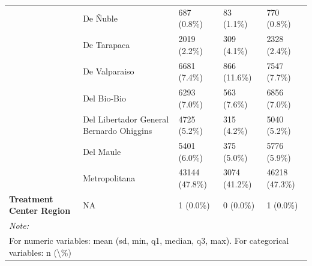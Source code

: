\documentclass[
  spanish,
  10pt,
]{article}
\begin{document}
\begin{table}[H]
{\begin{tabular}[t]{>{}lllll}
\cmidrule{2-5}
 & De Ñuble & 687 (0.8\%) & 83 (1.1\%) & 770 (0.8\%)\\
\cmidrule{2-5}
 & De Tarapaca & 2019 (2.2\%) & 309 (4.1\%) & 2328 (2.4\%)\\
\cmidrule{2-5}
 & De Valparaiso & 6681 (7.4\%) & 866 (11.6\%) & 7547 (7.7\%)\\
\cmidrule{2-5}
 & Del Bio-Bio & 6293 (7.0\%) & 563 (7.6\%) & 6856 (7.0\%)\\
\cmidrule{2-5}
 & Del Libertador General  Bernardo Ohiggins & 4725 (5.2\%) & 315 (4.2\%) & 5040 (5.2\%)\\
\cmidrule{2-5}
 & Del Maule & 5401 (6.0\%) & 375 (5.0\%) & 5776 (5.9\%)\\
\cmidrule{2-5}
 & Metropolitana & 43144 (47.8\%) & 3074 (41.2\%) & 46218 (47.3\%)\\
\cmidrule{2-5}
\multirow[t]{-17}{*}{\raggedright\arraybackslash \textbf{Treatment Center Region}} & NA & 1 (0.0\%) & 0 (0.0\%) & 1 (0.0\%)\\
\bottomrule
\multicolumn{5}{l}{\rule{0pt}{1em}\textit{Note: }}\\
\multicolumn{5}{l}{\rule{0pt}{1em}For numeric variables: mean (sd, min, q1, median, q3, max). For categorical variables: n (\textbackslash{}\%)}\\
\end{tabular}}
\end{table}
\end{document}
